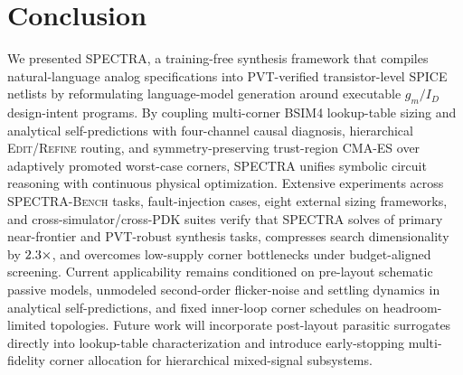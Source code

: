 \section{Conclusion}
\label{sec:conclusion}

We presented \textsc{SPECTRA}, a training-free synthesis framework that compiles natural-language analog specifications into PVT-verified transistor-level SPICE netlists by reformulating language-model generation around executable $g_m/I_D$ design-intent programs. By coupling multi-corner BSIM4 lookup-table sizing and analytical self-predictions with four-channel causal diagnosis, hierarchical \textsc{Edit}/\textsc{Refine} routing, and symmetry-preserving trust-region CMA-ES over adaptively promoted worst-case corners, \textsc{SPECTRA} unifies symbolic circuit reasoning with continuous physical optimization. Extensive experiments across \NTasksTotal{} \textsc{SPECTRA-Bench} tasks, \FaultN{} fault-injection cases, eight external sizing frameworks, and cross-simulator/cross-PDK suites verify that \textsc{SPECTRA} solves \SpectraPrim{} of primary near-frontier and PVT-robust synthesis tasks, compresses search dimensionality by $2.3{}\times$, and overcomes low-supply corner bottlenecks under budget-aligned screening. Current applicability remains conditioned on pre-layout schematic passive models, unmodeled second-order flicker-noise and settling dynamics in analytical self-predictions, and fixed inner-loop corner schedules on headroom-limited topologies. Future work will incorporate post-layout parasitic surrogates directly into lookup-table characterization and introduce early-stopping multi-fidelity corner allocation for hierarchical mixed-signal subsystems.

